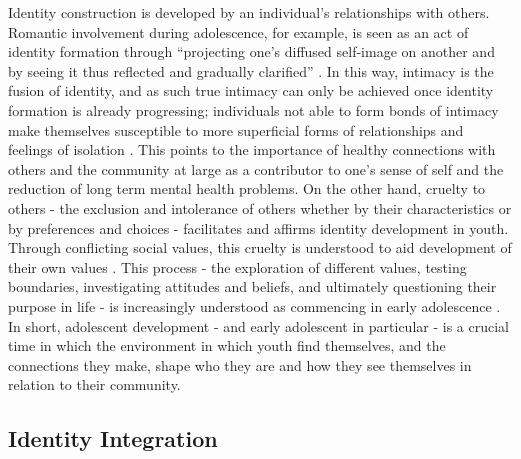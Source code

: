 Identity construction is developed by an individual's relationships with others. Romantic involvement during adolescence, for example, is seen as an act of identity formation through “projecting one’s diffused self-image on another and by seeing it thus reflected and gradually clarified” \citep[][p132]{Erikson1968}. In this way, intimacy is the fusion of identity, and as such true intimacy can only be achieved once identity formation is already progressing; individuals not able to form bonds of intimacy make themselves susceptible to more superficial forms of relationships and feelings of isolation \citep[][]{Erikson1968}. This points to the importance of healthy connections with others and the community at large as a contributor to one's sense of self and the reduction of long term mental health problems. On the other hand, cruelty to others - the exclusion and intolerance of others whether by their characteristics or by preferences and choices - facilitates and affirms identity development in youth. Through conflicting social values, this cruelty is understood to aid development of their own values \citep[][]{Erikson1968}. This process - the exploration of different values, testing boundaries, investigating attitudes and beliefs, and ultimately questioning their purpose in life - is increasingly understood as commencing in early adolescence \citep{Verlande2002}. In short, adolescent development - and early adolescent in particular - is a crucial time in which the environment in which youth find themselves, and the connections they make, shape who they are and how they see themselves in relation to their community.

\subsection{Identity Integration}

